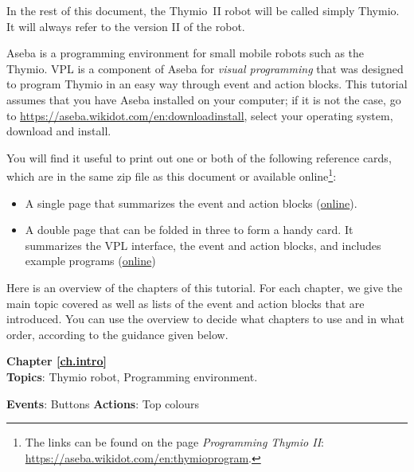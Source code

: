In the rest of this document, the Thymio~II robot will be called simply Thymio.
It will always refer to the version II of the robot.

Aseba is a programming environment for small mobile robots such as the Thymio.
VPL is a component of Aseba for \textit{visual programming} that was designed to program Thymio in an easy way through event and action blocks.
This tutorial assumes that you have Aseba installed on your computer; if it is not the case, go to \url{https://aseba.wikidot.com/en:downloadinstall}, select your operating system, download and install.


You will find it useful to print out one or both of the following reference
cards, which are in the same zip file as this document or available online\footnote{The links can be found on the page \textit{Programming Thymio II}: \\
\url{https://aseba.wikidot.com/en:thymioprogram}.}:

\begin{itemize}
\item A single page that summarizes the event and action blocks (\href{https://aseba.wdfiles.com/local--files/en:thymioprogram/thymio-vpl-ref-card-en.pdf}{online}).
\item A double page that can be folded in three to form a handy card.
It summarizes the VPL interface, the event and action blocks, and includes example programs (\href{https://aseba.wdfiles.com/local--files/en:thymioprogram/thymio-vpl-folding-ref-card-en.pdf}{online})\\
\end{itemize}


Here is an overview of the chapters of this tutorial.
For each chapter, we give the main topic covered as well as lists
of the event and action blocks that are introduced.
You can use the overview to decide what chapters to use
and in what order, according to the guidance given below.

{\centering \textbf{Chapter \ref{ch.intro}}\\}
\textbf{Topics}: Thymio robot, Programming environment.

\textbf{Events}: Buttons \hfill \textbf{Actions}: Top colours

 \hfill {}

\bigskip

